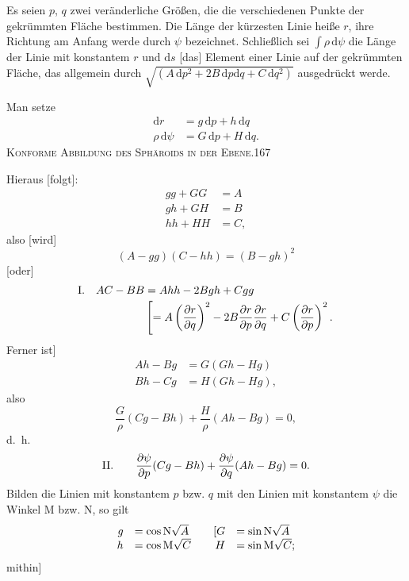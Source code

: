 Es seien $p$, $q$ zwei veränderliche Größen, die die verschiedenen Punkte der gekrümmten Fläche bestimmen. Die Länge der kürzesten Linie heiße $r$, ihre Richtung am Anfang werde durch $\psi$ bezeichnet. Schließlich sei $\int\rho\,\mathrm d\psi$ die Länge der Linie mit konstantem $r$ und $\mathrm ds$ [das] Element einer Linie auf der gekrümmten Fläche, das allgemein durch $\sqrt{(A\,\mathrm dp^2+2B\,\mathrm dp\mathrm dq+C\,\mathrm dq^2)}$ ausgedrückt werde.

Man setze
\[
\begin{aligned}
\mathrm dr&=g\,\mathrm dp+h\,\mathrm dq\\
\rho\,\mathrm d\psi&=G\,\mathrm dp+H\,\mathrm dq.
\end{aligned}
\]
\clearpage
\noindent\mbox{}\hfill\textsc{Konforme Abbildung des Sphäroids in der Ebene.}\hfill167\par\medskip
Hieraus [folgt]:
\[
\begin{aligned}
gg+GG&=A\\
gh+GH&=B\\
hh+HH&=C,
\end{aligned}
\]
also [wird]
\[
(A-gg)(C-hh)=(B-gh)^2
\]
[oder]
\[
\begin{array}{r@{\quad}l}
\mathrm I.&\begin{aligned}[t]
AC-BB&=Ahh-2Bgh+Cgg\\
&\left[=A\left(\frac{\partial r}{\partial q}\right)^2-2B\frac{\partial r}{\partial p}\frac{\partial r}{\partial q}+C\left(\frac{\partial r}{\partial p}\right)^2.\right.
\end{aligned}
\end{array}
\]
Ferner ist]
\[
\begin{aligned}
Ah-Bg&=G(Gh-Hg)\\
Bh-Cg&=H(Gh-Hg),
\end{aligned}
\]
also
\[
\frac G\rho(Cg-Bh)+\frac H\rho(Ah-Bg)=0,
\]
d.~h.
\[
\begin{array}{r@{\qquad}l}
\mathrm{II}.&\displaystyle\frac{\partial\psi}{\partial p}(Cg-Bh)+\frac{\partial\psi}{\partial q}(Ah-Bg)=0.
\end{array}
\]
Bilden die Linien mit konstantem $p$ bzw. $q$ mit den Linien mit konstantem $\psi$ die Winkel $\mathrm M$ bzw. $\mathrm N$, so gilt
\[
\begin{array}{rl@{\qquad}rl}
g&=\cos\mathrm N\sqrt A&[G&=\sin\mathrm N\sqrt A\\
h&=\cos\mathrm M\sqrt C&H&=\sin\mathrm M\sqrt C;
\end{array}
\]
mithin]
